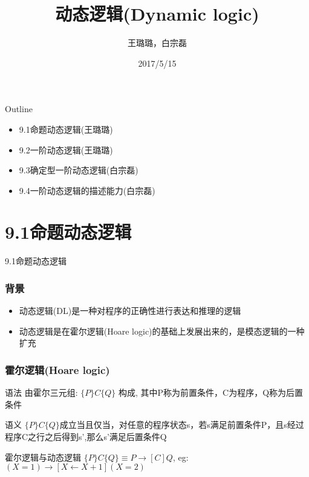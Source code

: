 \documentclass{beamer}
\title[标题]{动态逻辑(Dynamic logic)}
\author[作者]{王璐璐，白宗磊}
\institute[单位]{北京大学信息科学与技术学院}
\date[日期]{2017/5/15}
\begin{document}

\begin{frame}
    \titlepage
\end{frame}


\begin{frame}{Outline}
    \begin{itemize}
   		\item 9.1命题动态逻辑(王璐璐)
    	\item 9.2一阶动态逻辑(王璐璐)
    	\item 9.3确定型一阶动态逻辑(白宗磊)
    	\item 9.4一阶动态逻辑的描述能力(白宗磊)
    \end{itemize}
\end{frame}


\section{9.1命题动态逻辑}

\begin{frame}
	\begin{center}
		\item 9.1命题动态逻辑
	\end{center}
\end{frame}


\begin{frame}
	\frametitle{背景}
	\begin{itemize}
		\item 动态逻辑(DL)是一种对程序的正确性进行表达和推理的逻辑
		\item 动态逻辑是在霍尔逻辑(Hoare logic)的基础上发展出来的，是模态逻辑的一种扩充
	\end{itemize}
\end{frame}


\begin{frame}
	\frametitle{霍尔逻辑(Hoare logic)}
	\begin{block}{语法}
		由霍尔三元组: $\{P\}C\{Q\}$ 构成, 其中P称为前置条件，C为程序，Q称为后置条件
	\end{block}
	\begin{block}{语义}
		$\{P\}C\{Q\}$成立当且仅当，对任意的程序状态s，若s满足前置条件P，且s经过程序C之行之后得到s',那么s'满足后置条件Q
	\end{block}
	\begin{block}{霍尔逻辑与动态逻辑}
		$\{P\}C\{Q\} \equiv P \rightarrow [C]Q$, eg: $(X=1) \rightarrow [X \leftarrow X+1](X=2)$
	\end{block}
\end{frame}
\end{document}
